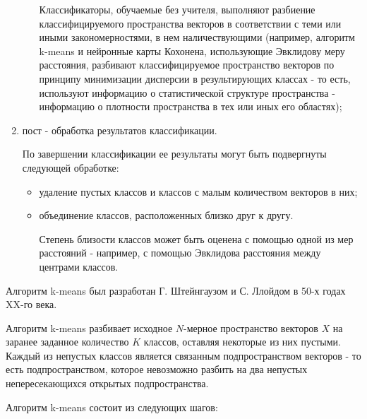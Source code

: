 \begin{enumerate}
\begin{itemize}
		Классификаторы, обучаемые без учителя, выполняют разбиение классифицируемого пространства векторов в соответствии с теми или иными закономерностями, в нем наличествующими (например, алгоритм k-means и нейронные карты Кохонена, использующие Эвклидову меру расстояния, разбивают классифицируемое пространство векторов по принципу минимизации дисперсии в результирующих классах - то есть, используют информацию о статистической структуре пространства - информацию о плотности пространства в тех или иных его областях);

	\end{itemize}

	\item пост - обработка результатов классификации.

	По завершении классификации ее результаты могут быть подвергнуты следующей обработке:

	\begin{itemize}

		\item удаление пустых классов и классов с малым количеством векторов в них;
		\item объединение классов, расположенных близко друг к другу.

		Степень близости классов может быть оценена с помощью одной из мер расстояний - например, с помощью Эвклидова расстояния между центрами классов.

	\end{itemize}

\end{enumerate}


Алгоритм k-means был разработан Г. Штейнгаузом и С. Ллойдом в 50-х годах XX-го века.

Алгоритм k-means разбивает исходное $N$-мерное пространство векторов $X$ на заранее заданное количество $K$ классов, оставляя некоторые из них пустыми. Каждый из непустых классов является связанным подпространством векторов - то есть подпространством, которое невозможно разбить на два непустых непересекающихся открытых подпространства.

Алгоритм k-means состоит из следующих шагов:

